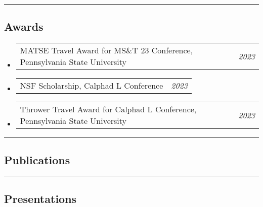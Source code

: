 \documentclass[10pt,letterpaper]{article}
\makeatletter
\newcommand{\headerrow}[2]
{\begin{tabular*}{\linewidth}{l@{\extracolsep{\fill}}r}
  #1 &
  #2 \\
\end{tabular*}}
\makeatother
\begin{document}
\hrule
\vspace{-0.6em}
\subsection*{Awards}

\begin{itemize}
  \parskip=0.1em
  \item  
  \headerrow
    {MATSE Travel Award for MS\&T 23 Conference, Pennsylvania State University} {\emph{2023}}
  \item
  \headerrow
    {NSF Scholarship, Calphad L Conference} {\emph{2023}}
  \item  
  \headerrow
    {Thrower Travel Award for Calphad L Conference, Pennsylvania State University} {\emph{2023}}
\end{itemize}


\hrule
\vspace{-0.6em}
\subsection*{Publications}



\hrule
\vspace{-0.6em}
\subsection*{Presentations}


\end{document}

